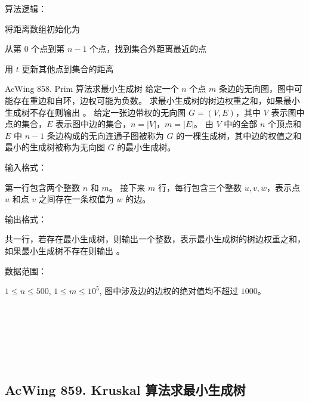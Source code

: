 算法逻辑：

\begin{myenum}
    \item 将距离数组初始化为 
    \item 从第 $0$ 个点到第 $n - 1$ 个点，找到集合外距离最近的点 
    \item 用 $t$ 更新其他点到集合的距离
\end{myenum}

\begin{titledbox}{AcWing 858. Prim 算法求最小生成树}
    给定一个 $n$ 个点 $m$ 条边的无向图，图中可能存在重边和自环，边权可能为负数。 求最小生成树的树边权重之和，如果最小生成树不存在则输出 。 给定一张边带权的无向图 $G=(V, E)$，其中 $V$ 表示图中点的集合，$E$ 表示图中边的集合，$n=|V|$，$m=|E|$。 由 $V$ 中的全部 $n$ 个顶点和 $E$ 中 $n-1$ 条边构成的无向连通子图被称为 $G$ 的一棵生成树，其中边的权值之和最小的生成树被称为无向图 $G$ 的最小生成树。

    输入格式：

    第一行包含两个整数 $n$ 和 $m$。 接下来 $m$ 行，每行包含三个整数 $u,v,w$，表示点 $u$ 和点 $v$ 之间存在一条权值为 $w$ 的边。

    输出格式：

    共一行，若存在最小生成树，则输出一个整数，表示最小生成树的树边权重之和，如果最小生成树不存在则输出 。

    数据范围：

    $1 \le n \le 500$, $1 \le m \le 10^5$, 图中涉及边的边权的绝对值均不超过 $1000$。

    \begin{inputblock}
         \\
         \\
         \\
         \\
         \\
    \end{inputblock}
    \begin{outputblock}
    \end{outputblock}
\end{titledbox}

\subsection{AcWing 859. Kruskal 算法求最小生成树}

